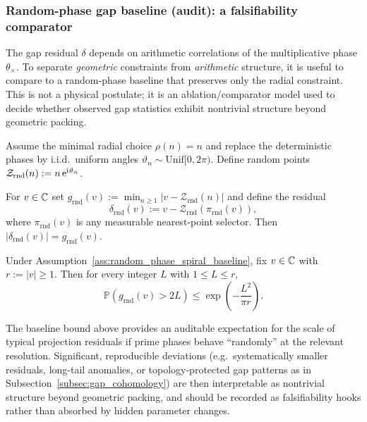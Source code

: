 \subsubsection{Random-phase gap baseline (audit): a falsifiability comparator}
\label{subsubsec:random_phase_gap_baseline}

\AuditTag The gap residual $\delta$ depends on arithmetic correlations of the multiplicative phase $\theta_\times$.
To separate \emph{geometric} constraints from \emph{arithmetic} structure, it is useful to compare to a random-phase baseline that preserves only the radial constraint.
This is not a physical postulate; it is an ablation/comparator model used to decide whether observed gap statistics exhibit nontrivial structure beyond geometric packing.

\begin{assumption}\label{ass:random_phase_spiral_baseline}
Assume the minimal radial choice $\rho(n)=n$ and replace the deterministic phases by i.i.d.\ uniform angles $\vartheta_n\sim \mathrm{Unif}[0,2\pi)$.
Define random points $\mathcal{Z}_{\mathrm{rnd}}(n):=n\,\mathrm{e}^{\mathrm{i}\vartheta_n}$.
\end{assumption}

\begin{definition}\label{def:random_phase_gap_def}
For $v\in\mathbb{C}$ set $g_{\mathrm{rnd}}(v):=\min_{n\ge 1}|v-\mathcal{Z}_{\mathrm{rnd}}(n)|$ and define the residual
\[
\delta_{\mathrm{rnd}}(v):=v-\mathcal{Z}_{\mathrm{rnd}}(\pi_{\mathrm{rnd}}(v)),
\]
where $\pi_{\mathrm{rnd}}(v)$ is any measurable nearest-point selector.
Then $|\delta_{\mathrm{rnd}}(v)|=g_{\mathrm{rnd}}(v)$.
\end{definition}

\begin{proposition}\label{prop:random_phase_gap_tail_baseline}
\MathTag Under Assumption~\ref{ass:random_phase_spiral_baseline}, fix $v\in\mathbb{C}$ with $r:=|v|\ge 1$.
Then for every integer $L$ with $1\le L\le r$,
\[
\mathbb{P}\!\left(g_{\mathrm{rnd}}(v)>2L\right)\le \exp\!\left(-\frac{L^2}{\pi r}\right).
\]
\end{proposition}

\begin{remark}\label{rem:random_phase_baseline_usage}
\AuditTag The baseline bound above provides an auditable expectation for the scale of typical projection residuals if prime phases behave ``randomly'' at the relevant resolution.
Significant, reproducible deviations (e.g.\ systematically smaller residuals, long-tail anomalies, or topology-protected gap patterns as in Subsection~\ref{subsec:gap_cohomology}) are then interpretable as nontrivial structure beyond geometric packing, and should be recorded as falsifiability hooks rather than absorbed by hidden parameter changes.
\end{remark}


